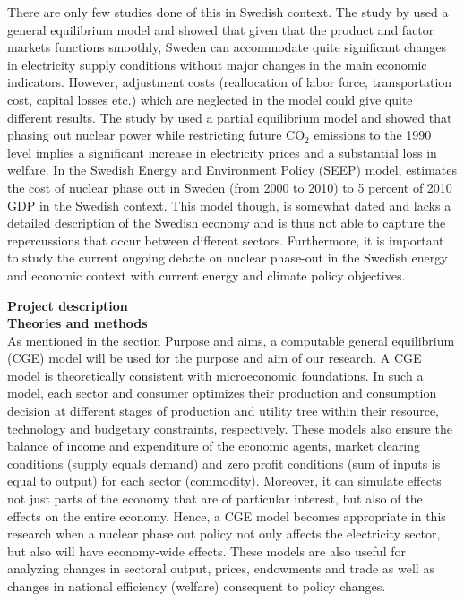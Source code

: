 There are only few studies done of this in Swedish context. The study by \cite{Bergman1981} used a general equilibrium model and showed that given that the product and factor markets functions smoothly, Sweden can accommodate quite significant changes in electricity supply conditions without major changes in the main economic indicators. However, adjustment costs (reallocation of labor force, transportation cost, capital losses etc.) which are neglected in the model could give quite different results. The study by \cite{Andersson1997} used a partial equilibrium model and showed that phasing out nuclear power while restricting future CO$_2$ emissions to the 1990 level implies a significant increase in electricity prices and a substantial loss in welfare. In the Swedish Energy and Environment Policy (SEEP) model, \cite{nordhaus1997swedish} estimates the cost of nuclear phase out in Sweden (from 2000 to 2010) to 5 percent of 2010 GDP in the Swedish context. This model though, is somewhat dated and lacks a detailed description of the Swedish economy and is thus not able to capture the repercussions that occur between different sectors. Furthermore, it is important to study the current ongoing debate on nuclear phase-out in the Swedish energy and economic context with current energy and climate policy objectives.

\textbf{Project description}\\
\textbf{Theories and methods}\\
As mentioned in the section Purpose and aims, a computable general equilibrium (CGE) model will be used for the purpose and aim of our research. A CGE model is theoretically consistent with microeconomic foundations. In such a model, each sector and consumer optimizes their production and consumption decision at different stages of production and utility tree within their resource, technology and budgetary constraints, respectively. These models also ensure the balance of income and expenditure of the economic agents, market clearing conditions (supply equals demand) and zero profit conditions (sum of inputs is equal to output) for each sector (commodity). Moreover, it can simulate effects not just parts of the economy that are of particular interest, but also of the effects on the entire economy. Hence, a CGE model becomes appropriate in this research when a nuclear phase out policy not only affects the electricity sector, but also will have economy-wide effects. These models are also useful for analyzing changes in sectoral output, prices, endowments and trade as well as changes in national efficiency (welfare) consequent to policy changes.

